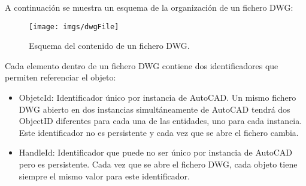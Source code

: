A continuación se muestra un esquema de la organización de un fichero DWG:

\begin{figure}[h]
\begin{center}
\texttt{[image: imgs/dwgFile]}
\caption{Esquema del contenido de un fichero DWG.}
\end{center}
\end{figure}

Cada elemento dentro de un fichero DWG contiene dos identificadores que permiten referenciar el objeto:

\begin{itemize}

\item{ObjetcId: Identificador único por instancia de AutoCAD. Un mismo fichero DWG abierto en dos instancias simultáneamente de AutoCAD tendrá dos ObjectID diferentes para cada una de las entidades, uno para cada instancia. Este identificador no es persistente y cada vez que se abre el fichero cambia.}

\item{HandleId: Identificador que puede no ser único por instancia de AutoCAD pero es persistente. Cada vez que se abre el fichero DWG, cada objeto tiene siempre el mismo valor para este identificador.}

\end{itemize}



